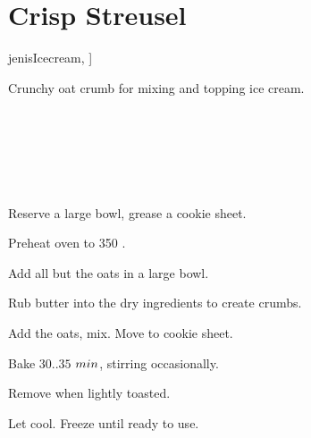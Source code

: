 \section{Crisp Streusel}

\begin{recipestats}[
        servings=3~$C$,
        bakingtime=30~\minute,
        inactivetime=1~\hour,
        original=\citetitle{jenisIcecream}~\cite[p.~198]{jenisIcecream},
    ]
\end{recipestats}

\begin{recipeabstract}
    Crunchy oat crumb for mixing and topping ice cream.
\end{recipeabstract}

\begin{ingredientcolumns}
    \begin{ingredientblock}
        \\
        \\
    \end{ingredientblock}
    \begin{ingredientblock}
        \\
        \\
    \end{ingredientblock}
\end{ingredientcolumns}

\begin{preparation}
\item Reserve a large bowl, grease a cookie sheet.
\item Preheat oven to 350 \Fahrenheit.
\item Add all but the oats in a large bowl.
\item Rub butter into the dry ingredients to create crumbs.
\item Add the oats, mix. Move to cookie sheet.
\item Bake $30..35$ $\minute$, stirring occasionally.
\item Remove when lightly toasted.
\item Let cool. Freeze until ready to use.
\end{preparation}

\recipeend%
